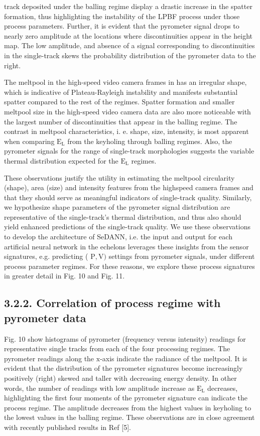 \documentclass[10pt]{article}
\begin{document}
track deposited under the balling regime display a drastic increase in the spatter formation, thus highlighting the instability of the LPBF process under those process parameters. Further, it is evident that the pyrometer signal drops to nearly zero amplitude at the locations where discontinuities appear in the height map. The low amplitude, and absence of a signal corresponding to discontinuities in the single-track skews the probability distribution of the pyrometer data to the right.

The meltpool in the high-speed video camera frames in has an irregular shape, which is indicative of Plateau-Rayleigh instability and manifests substantial spatter compared to the rest of the regimes. Spatter formation and smaller meltpool size in the high-speed video camera data are also more noticeable with the largest number of discontinuities that appear in the balling regime. The contrast in meltpool characteristics, i. e. shape, size, intensity, is most apparent when comparing $\mathrm{E}_{\mathrm{L}}$ from the keyholing through balling regimes. Also, the pyrometer signals for the range of single-track morphologies suggests the variable thermal distribution expected for the $\mathrm{E}_{\mathrm{L}}$ regimes.

These observations justify the utility in estimating the meltpool circularity (shape), area (size) and intensity features from the highspeed camera frames and that they should serve as meaningful indicators of single-track quality. Similarly, we hypothesize shape parameters of the pyrometer signal distribution are representative of the single-track's thermal distribution, and thus also should yield enhanced predictions of the single-track quality. We use these observations to develop the architecture of SeDANN, i.e. the input and output for each artificial neural network in the echelons leverages these insights from the sensor signatures, e.g. predicting ( $\mathrm{P}, \mathrm{V})$ settings from pyrometer signals, under different process parameter regimes. For these reasons, we explore these process signatures in greater detail in Fig. 10 and Fig. 11.

\subsection*{3.2.2. Correlation of process regime with pyrometer data}
Fig. 10 show histograms of pyrometer (frequency versus intensity) readings for representative single tracks from each of the four processing regimes. The pyrometer readings along the $\mathrm{x}$-axis indicate the radiance of the meltpool. It is evident that the distribution of the pyrometer signatures become increasingly positively (right) skewed and taller with decreasing energy density. In other words, the number of readings with low amplitude increase as $\mathrm{E}_{\mathrm{L}}$ decreases, highlighting the first four moments of the pyrometer signature can indicate the process regime. The amplitude decreases from the highest values in keyholing to the lowest values in the balling regime. These observations are in close agreement with recently published results in Ref [5].
\end{document}
